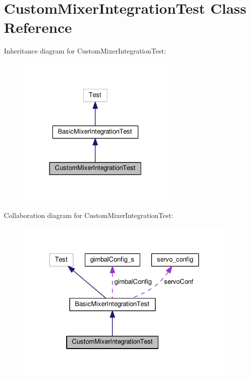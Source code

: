 \hypertarget{classCustomMixerIntegrationTest}{\section{Custom\+Mixer\+Integration\+Test Class Reference}
\label{classCustomMixerIntegrationTest}
}


Inheritance diagram for Custom\+Mixer\+Integration\+Test\+:\nopagebreak
\begin{figure}[H]
\begin{center}
\leavevmode
\includegraphics[width=220pt]{classCustomMixerIntegrationTest__inherit__graph}
\end{center}
\end{figure}


Collaboration diagram for Custom\+Mixer\+Integration\+Test\+:\nopagebreak
\begin{figure}[H]
\begin{center}
\leavevmode
\includegraphics[width=308pt]{classCustomMixerIntegrationTest__coll__graph}
\end{center}
\end{figure}
